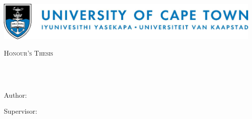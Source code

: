 \documentclass[
12pt, %
english, %
singlespacing, %
parskip, %
headsepline, %
openany,
]{MastersDoctoralThesis} %
\author{Pavan \textsc{Singh}} %
\numberwithin{theorem}{section}
\numberwithin{remark}{section}
\numberwithin{assumption}{section}
\begin{document}
\frontmatter %

\pagestyle{plain} %


\begin{titlepage}
\begin{center}

\includegraphics*[width=\linewidth]{Figures/UCTLogoLong.jpg} 

\vspace*{.06\textheight}
{\scshape\LARGE \univname\par}\vspace{1.0cm} %
\textsc{\Large Honour's Thesis}\\[0.5cm] %

\HRule \\[0.4cm] %
{\large \bfseries \ttitle\par}\vspace{0.4cm} %
\HRule \\[1.5cm] %
 
\begin{minipage}[t]{0.4\textwidth}
\begin{flushleft} \large
{Author:}\\
\authorname
\end{flushleft}
\end{minipage}
\begin{minipage}[t]{0.4\textwidth}
\begin{flushright} \large
{Supervisor:} \\
\supname
\end{flushright}
\end{minipage}\\[1cm]
 
\vfill


\end{center}
\end{titlepage}
\end{document}
